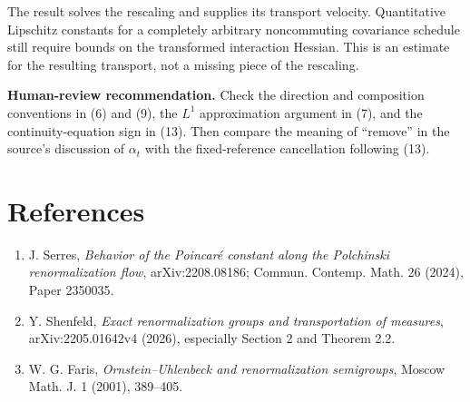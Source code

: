 \documentclass[11pt]{article}
\begin{document}
The result solves the rescaling and supplies its transport velocity.
Quantitative Lipschitz constants for a completely arbitrary noncommuting
covariance schedule still require bounds on the transformed interaction
Hessian.  This is an estimate for the resulting transport, not a missing
piece of the rescaling.

\textbf{Human-review recommendation.} Check the direction and composition
conventions in (6) and (9), the $L^1$ approximation argument in (7), and the
continuity-equation sign in (13).  Then compare the meaning of ``remove'' in
the source's discussion of $\alpha_t$ with the fixed-reference cancellation
following (13).

\section*{References}

\begin{enumerate}\raggedright
\item J. Serres, \emph{Behavior of the Poincar\'e constant along the
Polchinski renormalization flow}, arXiv:2208.08186; Commun. Contemp. Math.
26 (2024), Paper 2350035.
\item Y. Shenfeld, \emph{Exact renormalization groups and transportation of
measures}, arXiv:2205.01642v4 (2026), especially Section 2 and Theorem 2.2.
\item W. G. Faris, \emph{Ornstein--Uhlenbeck and renormalization
semigroups}, Moscow Math. J. 1 (2001), 389--405.
\end{enumerate}
\end{document}
